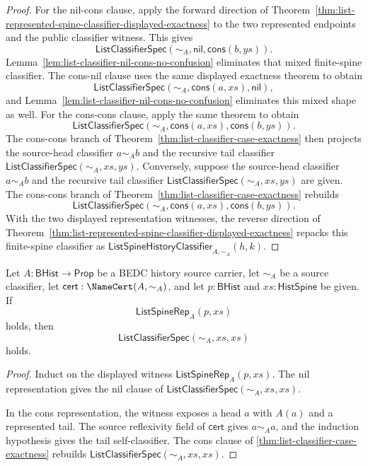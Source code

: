 \begin{proof}
For the nil-cons clause, apply the forward direction of
Theorem~\ref{thm:list-represented-spine-classifier-displayed-exactness} to the
two represented endpoints and the public classifier witness. This gives
$$
\mathsf{ListClassifierSpec}(\sim_A,\mathsf{nil},\mathsf{cons}(b,ys)).
$$
Lemma~\ref{lem:list-classifier-nil-cons-no-confusion} eliminates that mixed
finite-spine classifier. The cons-nil clause uses the same displayed exactness
theorem to obtain
$$
\mathsf{ListClassifierSpec}(\sim_A,\mathsf{cons}(a,xs),\mathsf{nil}),
$$
and Lemma~\ref{lem:list-classifier-nil-cons-no-confusion} eliminates this mixed
shape as well. For the cons-cons clause, apply the same theorem to obtain
$$
\mathsf{ListClassifierSpec}(\sim_A,\mathsf{cons}(a,xs),\mathsf{cons}(b,ys)).
$$
The cons-cons branch of Theorem~\ref{thm:list-classifier-case-exactness} then
projects the source-head classifier $a\sim_A b$ and the recursive tail
classifier $\mathsf{ListClassifierSpec}(\sim_A,xs,ys)$. Conversely, suppose the
source-head classifier $a\sim_A b$ and the recursive tail classifier
$\mathsf{ListClassifierSpec}(\sim_A,xs,ys)$ are given. The cons-cons branch of
Theorem~\ref{thm:list-classifier-case-exactness} rebuilds
$$
\mathsf{ListClassifierSpec}(\sim_A,\mathsf{cons}(a,xs),\mathsf{cons}(b,ys)).
$$
With the two displayed representation witnesses, the reverse direction of
Theorem~\ref{thm:list-represented-spine-classifier-displayed-exactness} repacks
this finite-spine classifier as
$\mathsf{ListSpineHistoryClassifier}_{A,\sim_A}(h,k)$.
\end{proof}

\begin{lemma}
\label{lem:list-represented-prefix-self-classifier}
Let $A:\mathsf{BHist}\to\mathsf{Prop}$ be a BEDC history source carrier, let
$\sim_A$ be a source classifier, let $\mathsf{cert}:\NameCert(A,\sim_A)$, and
let $p:\mathsf{BHist}$ and $xs:\mathsf{HistSpine}$ be given. If
$$
\mathsf{ListSpineRep}_A(p,xs)
$$
holds, then
$$
\mathsf{ListClassifierSpec}(\sim_A,xs,xs)
$$
holds.
\end{lemma}
\begin{proof}
Induct on the displayed witness $\mathsf{ListSpineRep}_A(p,xs)$. The nil
representation gives the nil clause of
$\mathsf{ListClassifierSpec}(\sim_A,xs,xs)$.

In the cons representation, the witness exposes a head $a$ with $A(a)$ and a
represented tail. The source reflexivity field of $\mathsf{cert}$ gives
$a\sim_A a$, and the induction hypothesis gives the tail self-classifier. The
cons clause of \autoref{thm:list-classifier-case-exactness} rebuilds
$\mathsf{ListClassifierSpec}(\sim_A,xs,xs)$.
\end{proof}

